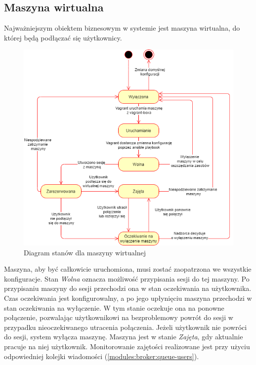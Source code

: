 \documentclass[../opis-rozwiazania.tex]{subfiles}
\begin{document}
\label{state_diagrams}

\subsection{Maszyna wirtualna}
Najważniejszym obiektem biznesowym w systemie jest maszyna wirtualna, do której będą podłączać się użytkownicy.

\begin{figure}[H]
  \centering
  \includegraphics[width=\textwidth]{../diagrams/state_diagrams/virtual_machine.png}
  \caption{Diagram stanów dla maszyny wirtualnej}
  \label{state_vm}
\end{figure}

Maszyna, aby być całkowicie uruchomiona, musi zostać zaopatrzona we wszystkie konfiguracje.
Stan \textit{Wolna} oznacza możliwość przypisania sesji do tej maszyny.
Po przypisaniu maszyny do sesji przechodzi ona w stan oczekiwania na użytkownika. Czas oczekiwania jest konfigurowalny, a po jego upłynięciu maszyna przechodzi w stan oczekiwania na wyłączenie.
W tym stanie oczekuje ona na ponowne połączenie, pozwalając użytkownikowi na bezproblemowy powrót do sesji w przypadku nieoczekiwanego utracenia połączenia. Jeżeli użytkownik nie powróci do sesji, system wyłącza maszynę.
Maszyna jest w stanie \textit{Zajęta}, gdy aktualnie pracuje na niej użytkownik. Monitorowanie zajętości realizowane jest przy użyciu odpowiedniej kolejki wiadomości (\ref{modules:broker:queue-users}). %
\end{document}
